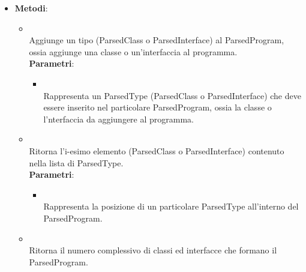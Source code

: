 \begin{itemize}
\begin{itemize}
\end{itemize}
\item \textbf{Metodi}:
\begin{itemize}
\item {}
\\ Aggiunge un tipo (ParsedClass o ParsedInterface) al ParsedProgram, ossia aggiunge una classe o un'interfaccia al programma.
\\ \textbf{Parametri}:
\begin{itemize}
\item {}
\\ Rappresenta un ParsedType (ParsedClass o ParsedInterface) che deve essere inserito nel particolare ParsedProgram, ossia la classe o l'nterfaccia da aggiungere al programma.
\end{itemize}
\item {}
\\ Ritorna l'i-esimo elemento (ParsedClass o ParsedInterface) contenuto nella lista di ParsedType.
\\ \textbf{Parametri}:
\begin{itemize}
\item {}
\\ Rappresenta la posizione di un particolare ParsedType all'interno del ParsedProgram.
\end{itemize}
\item {}
\\ Ritorna il numero complessivo di classi ed interfacce che formano il ParsedProgram.
\end{itemize}
\end{itemize}

